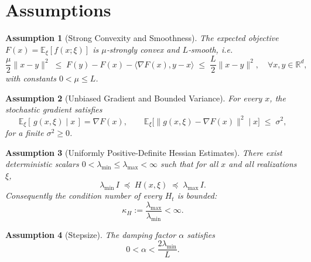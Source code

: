 \documentclass{article}
\newtheorem{assumption}{Assumption}[section]
\begin{document}
\section*{Assumptions}
\begin{assumption}[Strong Convexity and Smoothness]\label{ass:strong-smooth}
The expected objective $F(x)=\mathbb{E}_\xi[f(x;\xi)]$ is $\mu$‑strongly convex and $L$‑smooth, i.e.
\[
\frac{\mu}{2}\|x-y\|^2 \;\le\; F(y)-F(x)-\langle\nabla F(x),y-x\rangle
\;\le\; \frac{L}{2}\|x-y\|^2,
\quad\forall x,y\in\mathbb{R}^d,
\]
with constants $0<\mu\le L$.
\end{assumption}

\begin{assumption}[Unbiased Gradient and Bounded Variance]\label{ass:grad}
For every $x$, the stochastic gradient satisfies
\[
\mathbb{E}_{\xi}[\,g(x,\xi)\mid x\,]=\nabla F(x),\qquad
\mathbb{E}_{\xi}\!\big[\|g(x,\xi)-\nabla F(x)\|^2\mid x\big]\;\le\;\sigma^2,
\]
for a finite $\sigma^2\ge0$.
\end{assumption}

\begin{assumption}[Uniformly Positive‑Definite Hessian Estimates]\label{ass:hessian-bounded}
There exist deterministic scalars $0<\lambda_{\min}\le\lambda_{\max}<\infty$ such that for all $x$ and all realizations $\xi$,
\[
\lambda_{\min}\,I \;\preceq\; H(x,\xi) \;\preceq\; \lambda_{\max}\,I .
\]
Consequently the condition number of every $H_t$ is bounded:
\[
\kappa_H:=\frac{\lambda_{\max}}{\lambda_{\min}}<\infty .
\]
\end{assumption}

\begin{assumption}[Stepsize]\label{ass:stepsize}
The damping factor $\alpha$ satisfies
\[
0<\alpha<\frac{2\lambda_{\min}}{L}.
\]
\end{assumption}
\end{document}
